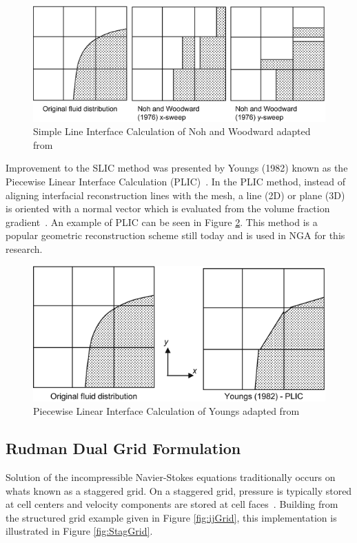 \begin{figure}[htbp]
	\centering
	\includegraphics[width=1.0\textwidth]{figs/SLIC.png}
	\caption{Simple Line Interface Calculation of Noh and Woodward adapted from \cite{SLICfig}}
	\label{fig:SLIC}
\end{figure}

Improvement to the SLIC method was presented by Youngs (1982)  known as the Piecewise Linear Interface Calculation (PLIC)~\cite{youngs}. In the PLIC method, instead of aligning interfacial reconstruction lines with the mesh, a line (2D) or plane (3D) is oriented with a normal vector which is evaluated from the volume fraction gradient~\cite{yeoh}. An example of PLIC can be seen in Figure \ref{fig:PLIC}. This method is a popular geometric reconstruction scheme still today and is used in NGA for this research.

\begin{figure}[htbp]
	\centering
	\includegraphics[width=1.0\textwidth]{figs/PLIC.png}
	\caption{Piecewise Linear Interface Calculation of Youngs adapted from \cite{yeoh}}
	\label{fig:PLIC}
\end{figure}

\subsection{Rudman Dual Grid Formulation}
Solution of the incompressible Navier-Stokes equations traditionally occurs on whats known as a staggered grid. On a staggered grid, pressure is typically stored at cell centers and velocity components are stored at cell faces~\cite{TRYG}. Building from the structured grid example given in Figure \ref{fig:ijGrid}, this implementation is illustrated in Figure \ref{fig:StagGrid}. 

